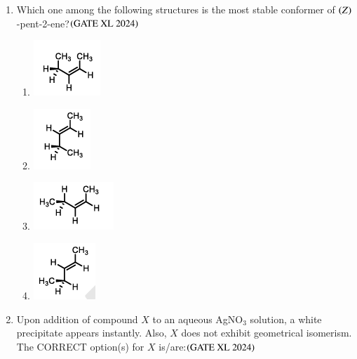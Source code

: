 \documentclass[journal]{IEEEtran}
\begin{document}
\begin{enumerate}
    \item Which one among the following structures is the most stable conformer of $\left(Z\right)$-pent-2-ene?\hfill $\left(\text{GATE XL 2024}\right)$
    \begin{enumerate}
            \item \includegraphics[width=0.2\columnwidth]{figs/xl2024_q22_op_A.png}
            \item \includegraphics[width=0.2\columnwidth]{figs/xl2024_q22_op_B.png}
            \item \includegraphics[width=0.2\columnwidth]{figs/xl2024_q22_op_C.png}
            \item \includegraphics[width=0.2\columnwidth]{figs/xl2024_q22_op_D.png}
    \end{enumerate}

    \item Upon addition of compound $X$ to an aqueous AgNO$_3$ solution, a white precipitate appears instantly. Also, $X$ does not exhibit geometrical isomerism. The CORRECT option(s) for $X$ is/are:\hfill $\left(\text{GATE XL 2024}\right)$
    \begin{enumerate}
    \end{enumerate}


\end{enumerate}
\end{document}
